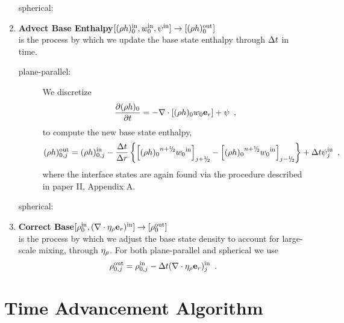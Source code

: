 \begin{enumerate}
\begin{description}
\item[spherical:]

\end{description}

\item {\bf Advect Base Enthalpy}$[(\rho h)_0^{\mathrm{in}},w_0^{\mathrm{in}},\psi^{\mathrm{in}}] \rightarrow [(\rho h)_0^{\mathrm{out}}]$\\
is the process by which we update the base state enthalpy through $\Delta t$ in time.
\begin{description}

\item[plane-parallel:] We discretize
\begin{equation}
\frac{\partial (\rho h)_0}{\partial t} = -\nabla\cdot\left[(\rho h)_0w_0\mathbf{e}_r\right] 
+ \psi \enskip ,
\end{equation}
to compute the new base state enthalpy,
\begin{equation}
(\rho h)_{0,j}^{\outp} = (\rho h)_{0,j}^{\inp} - \frac{\dt}{\Delta r}
\left\{ \left[ {(\rho h)_0}^{\nph} {w_0}^{\inp}\right]_{j+\myhalf} -  
         \left[ {(\rho h)_0}^{\nph} {w_0}^{\inp}\right]_{j-\myhalf} \right\}
+ \dt\psi_j^{\inp} \enskip ,
\end{equation}
where the interface states are again found via the procedure described
in paper II, Appendix A.

\item[spherical:]

\end{description}

\item {\bf Correct Base}$[\rho_0^{\mathrm{in}}, (\nabla\cdot\eta_{\rho}\mathbf{e}_r)^{\mathrm{in}}] \rightarrow [\rho_0^{\mathrm{out}}]$\\
is the process by which we adjust the base state density to account for
large-scale mixing, through $\eta_{\rho}$.  For both plane-parallel and spherical
we use
\begin{equation}
\rho_{0,j}^{\mathrm{out}} = \rho_{0,j}^{\mathrm{in}} - \Delta t (\nabla\cdot\eta_{\rho}\mathbf{e}_r)^{\mathrm{in}}_j \enskip . 
\end{equation}

\end{enumerate}


\section{Time Advancement Algorithm}

